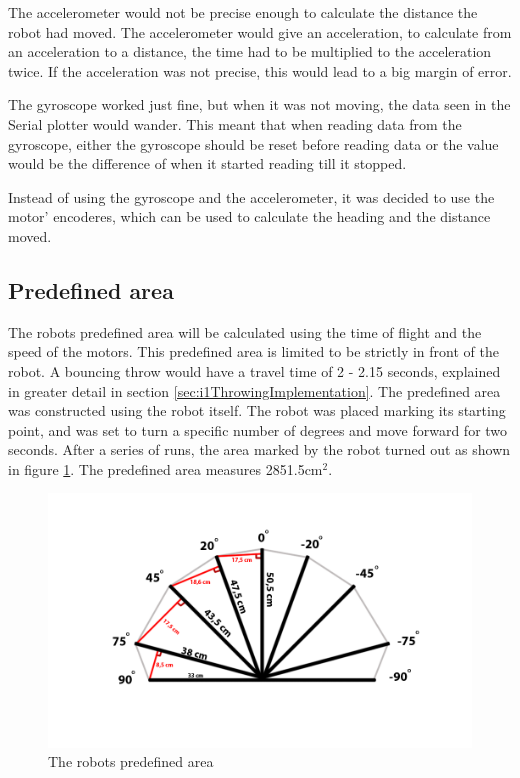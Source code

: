 The accelerometer would not be precise enough to calculate the distance the robot had moved. The accelerometer would give an acceleration, to calculate from an acceleration to a distance, the time had to be multiplied to the acceleration twice. If the acceleration was not precise, this would lead to a big margin of error. 

The gyroscope worked just fine, but when it was not moving, the data seen in the Serial plotter would wander. This meant that when reading data from the gyroscope, either the gyroscope should be reset before reading data or the value would be the difference of when it started reading till it stopped. 

Instead of using the gyroscope and the accelerometer, it was decided to use the motor' encoderes, which can be used to calculate the heading and the distance moved. 


\subsection{Predefined area}
\label{sec:i1Predefined areaImplementation}
The robots predefined area will be calculated using the time of flight and the speed of the motors. 
This predefined area is limited to be strictly in front of the robot.
A bouncing throw would have a travel time of 2 - 2.15 seconds, explained in greater detail in section \ref{sec:i1ThrowingImplementation}. The predefined area was constructed using the robot itself. The robot was placed marking its starting point, and was set to turn a specific number of degrees and move forward for two seconds. After a series of runs, the area marked by the robot turned out as shown in figure \ref{figure:Predefined area}. The predefined area measures 2851.5cm\begin{math}^2\end{math}.

\begin{figure}[h]
\centering
\includegraphics[scale=0.35]{billeder/predefined-area}
\caption{The robots predefined area}
\label{figure:Predefined area}
\end{figure}


